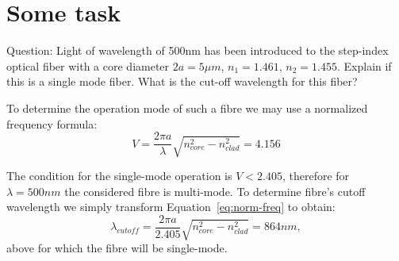 \section{Some task}
Question: Light of wavelength of 500nm has been introduced to the step-index optical fiber with a core diameter $2a=5\mu m$, $n_1=1.461$, $n_2=1.455$. Explain if this is a single mode fiber. What is the cut-off wavelength for this fiber?\bigskip

To determine the operation mode of such a fibre we may use a normalized frequency formula:
\begin{equation}\label{eq:norm-freq}
    V = \frac{2\pi a}{\lambda}\sqrt{n_{core}^2-n_{clad}^2} = 4.156
\end{equation}

The condition for the single-mode operation is $V<2.405$, therefore for $\lambda=500nm$ the considered fibre is multi-mode. To determine fibre's cutoff wavelength we simply transform Equation~\ref{eq:norm-freq} to obtain:
\begin{equation}
    \lambda_{cutoff} = \frac{2\pi a}{2.405}\sqrt{n_{core}^2-n_{clad}^2} = 864nm,
\end{equation}
above for which the fibre will be single-mode.
